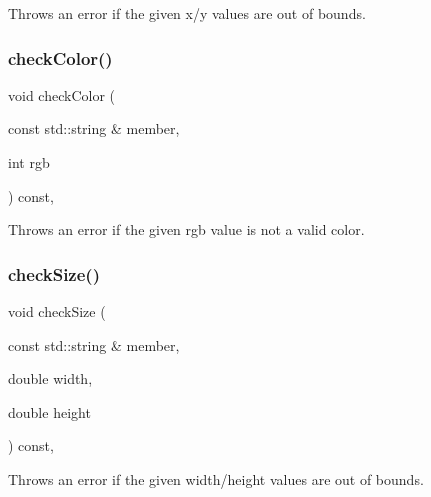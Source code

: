 Throws an error if the given x/y values are out of bounds. 

\mbox{\label{classGDrawingSurface_a9841b5dc607ca41a14819d80e1d8a09c}} 
\subsubsection{\texorpdfstring{check\+Color()}{checkColor()}}
{\footnotesize\ttfamily void check\+Color (\begin{DoxyParamCaption}\item[{const std\+::string \&}]{member,  }\item[{int}]{rgb }\end{DoxyParamCaption}) const\hspace{0.3cm}{\ttfamily [protected]}, {\ttfamily [inherited]}}



Throws an error if the given rgb value is not a valid color. 

\mbox{\label{classGDrawingSurface_a70a6546707ae708573396616bd0f5320}} 
\subsubsection{\texorpdfstring{check\+Size()}{checkSize()}}
{\footnotesize\ttfamily void check\+Size (\begin{DoxyParamCaption}\item[{const std\+::string \&}]{member,  }\item[{double}]{width,  }\item[{double}]{height }\end{DoxyParamCaption}) const\hspace{0.3cm}{\ttfamily [protected]}, {\ttfamily [inherited]}}



Throws an error if the given width/height values are out of bounds. 

\mbox{\label{classGWindow_a14da494e7a105db49b15cbd11db68774}} 
